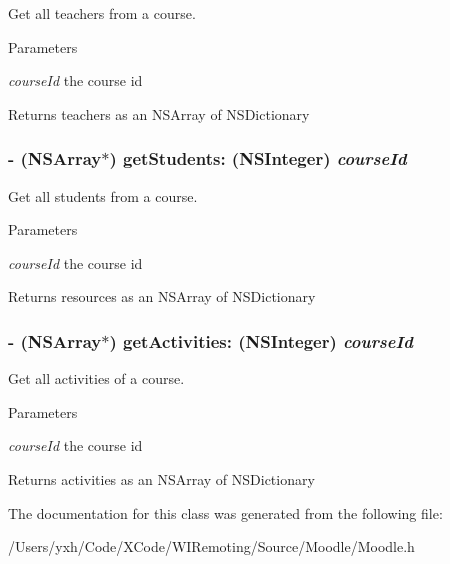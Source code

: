 Get all teachers from a course. 
\begin{DoxyParams}{Parameters}
\item[{\em courseId}]the course id \end{DoxyParams}
\begin{DoxyReturn}{Returns}
teachers as an NSArray of NSDictionary 
\end{DoxyReturn}
\hypertarget{interface_moodle_a0a15c6cd198f7448b8f363d2b5a3e33d}{
\subsubsection[{getStudents:}]{\setlength{\rightskip}{0pt plus 5cm}-\/ (NSArray$\ast$) getStudents: (NSInteger) {\em courseId}}}
\label{interface_moodle_a0a15c6cd198f7448b8f363d2b5a3e33d}


Get all students from a course. 
\begin{DoxyParams}{Parameters}
\item[{\em courseId}]the course id \end{DoxyParams}
\begin{DoxyReturn}{Returns}
resources as an NSArray of NSDictionary 
\end{DoxyReturn}
\hypertarget{interface_moodle_a7c17a97046fb3e9f9770c35bf5aa568c}{
\subsubsection[{getActivities:}]{\setlength{\rightskip}{0pt plus 5cm}-\/ (NSArray$\ast$) getActivities: (NSInteger) {\em courseId}}}
\label{interface_moodle_a7c17a97046fb3e9f9770c35bf5aa568c}


Get all activities of a course. 
\begin{DoxyParams}{Parameters}
\item[{\em courseId}]the course id \end{DoxyParams}
\begin{DoxyReturn}{Returns}
activities as an NSArray of NSDictionary 
\end{DoxyReturn}


The documentation for this class was generated from the following file:\begin{DoxyCompactItemize}
\item 
/Users/yxh/Code/XCode/WIRemoting/Source/Moodle/Moodle.h\end{DoxyCompactItemize}
